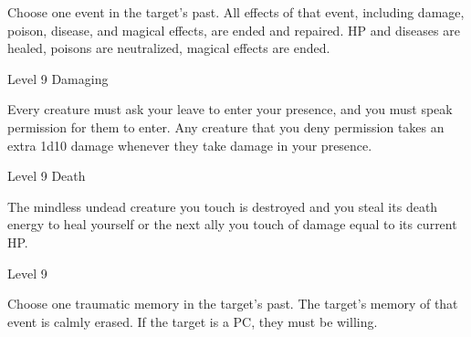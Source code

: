 Choose one event in the target's past. All effects of that event, including damage, poison, disease, and magical effects, are ended and repaired. HP and diseases are healed, poisons are neutralized, magical effects are ended.

       
\startSpellName
          	Level 9	Damaging
\stopSpellName
       

Every creature must ask your leave to enter your presence, and you must speak permission for them to enter. Any creature that you deny permission takes an extra 1d10 damage whenever they take damage in your presence.

       
\startSpellName
          	Level 9	Death
\stopSpellName
       

The mindless undead creature you touch is destroyed and you steal its death energy to heal yourself or the next ally you touch of damage equal to its current HP.

       
\startSpellName
          	Level 9
\stopSpellName
       

Choose one traumatic memory in the target's past. The target's memory of that event is calmly erased. If the target is a PC, they must be willing.

     

           
